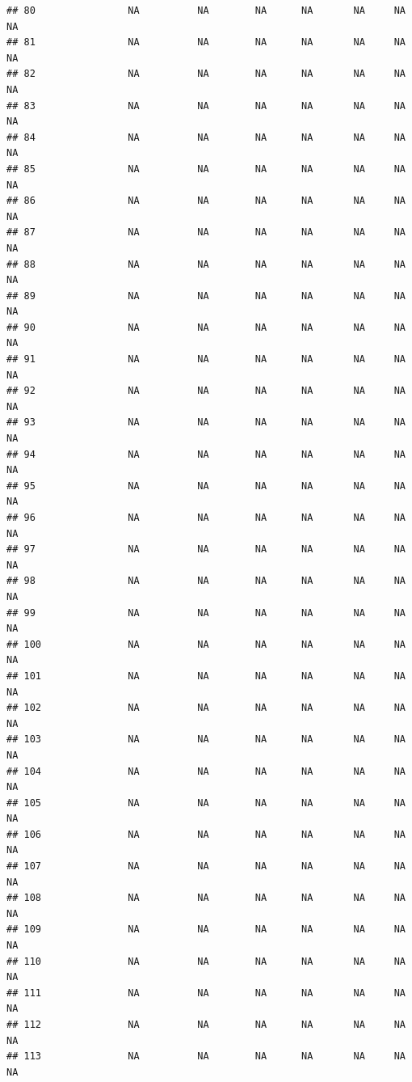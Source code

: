 \documentclass[
]{article}
\begin{document}
\begin{verbatim}
## 80                NA          NA        NA      NA       NA     NA     NA
## 81                NA          NA        NA      NA       NA     NA     NA
## 82                NA          NA        NA      NA       NA     NA     NA
## 83                NA          NA        NA      NA       NA     NA     NA
## 84                NA          NA        NA      NA       NA     NA     NA
## 85                NA          NA        NA      NA       NA     NA     NA
## 86                NA          NA        NA      NA       NA     NA     NA
## 87                NA          NA        NA      NA       NA     NA     NA
## 88                NA          NA        NA      NA       NA     NA     NA
## 89                NA          NA        NA      NA       NA     NA     NA
## 90                NA          NA        NA      NA       NA     NA     NA
## 91                NA          NA        NA      NA       NA     NA     NA
## 92                NA          NA        NA      NA       NA     NA     NA
## 93                NA          NA        NA      NA       NA     NA     NA
## 94                NA          NA        NA      NA       NA     NA     NA
## 95                NA          NA        NA      NA       NA     NA     NA
## 96                NA          NA        NA      NA       NA     NA     NA
## 97                NA          NA        NA      NA       NA     NA     NA
## 98                NA          NA        NA      NA       NA     NA     NA
## 99                NA          NA        NA      NA       NA     NA     NA
## 100               NA          NA        NA      NA       NA     NA     NA
## 101               NA          NA        NA      NA       NA     NA     NA
## 102               NA          NA        NA      NA       NA     NA     NA
## 103               NA          NA        NA      NA       NA     NA     NA
## 104               NA          NA        NA      NA       NA     NA     NA
## 105               NA          NA        NA      NA       NA     NA     NA
## 106               NA          NA        NA      NA       NA     NA     NA
## 107               NA          NA        NA      NA       NA     NA     NA
## 108               NA          NA        NA      NA       NA     NA     NA
## 109               NA          NA        NA      NA       NA     NA     NA
## 110               NA          NA        NA      NA       NA     NA     NA
## 111               NA          NA        NA      NA       NA     NA     NA
## 112               NA          NA        NA      NA       NA     NA     NA
## 113               NA          NA        NA      NA       NA     NA     NA

\end{verbatim}
\end{document}
